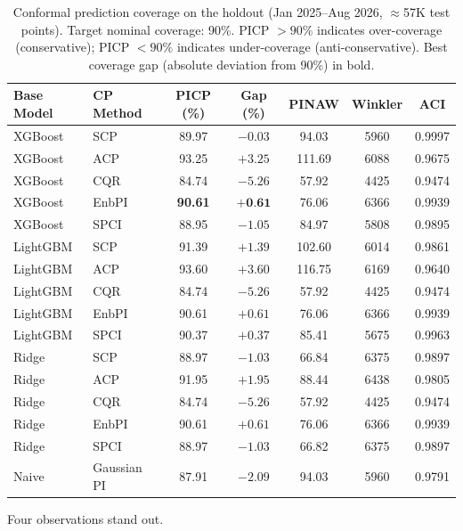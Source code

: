 \documentclass[preprint,12pt]{elsarticle}
\begin{document}
\begin{enumerate}
\begin{table}[t]
\centering
\caption{Conformal prediction coverage on the holdout (Jan 2025--Aug 2026, $\approx$57K test points). Target nominal coverage: 90\%. PICP $>90\%$ indicates over-coverage (conservative); PICP $<90\%$ indicates under-coverage (anti-conservative). Best coverage gap (absolute deviation from 90\%) in bold.}
\label{tab:main}
\begin{tabular}{llccccc}
\toprule
\textbf{Base Model} & \textbf{CP Method} & \textbf{PICP (\%)} & \textbf{Gap (\%)} & \textbf{PINAW} & \textbf{Winkler} & \textbf{ACI} \\
\midrule
XGBoost  & SCP           & 89.97 & $-0.03$ & 94.03 & 5960 & 0.9997 \\
XGBoost  & ACP           & 93.25 & $+3.25$ & 111.69 & 6088 & 0.9675 \\
XGBoost  & CQR           & 84.74 & $-5.26$ & 57.92 & 4425 & 0.9474 \\
XGBoost  & EnbPI         & \textbf{90.61} & $\textbf{+0.61}$ & 76.06 & 6366 & 0.9939 \\
XGBoost  & SPCI          & 88.95 & $-1.05$ & 84.97 & 5808 & 0.9895 \\
LightGBM & SCP           & 91.39 & $+1.39$ & 102.60 & 6014 & 0.9861 \\
LightGBM & ACP           & 93.60 & $+3.60$ & 116.75 & 6169 & 0.9640 \\
LightGBM & CQR           & 84.74 & $-5.26$ & 57.92 & 4425 & 0.9474 \\
LightGBM & EnbPI         & 90.61 & $+0.61$ & 76.06 & 6366 & 0.9939 \\
LightGBM & SPCI          & 90.37 & $+0.37$ & 85.41 & 5675 & 0.9963 \\
Ridge    & SCP           & 88.97 & $-1.03$ & 66.84 & 6375 & 0.9897 \\
Ridge    & ACP           & 91.95 & $+1.95$ & 88.44 & 6438 & 0.9805 \\
Ridge    & CQR           & 84.74 & $-5.26$ & 57.92 & 4425 & 0.9474 \\
Ridge    & EnbPI         & 90.61 & $+0.61$ & 76.06 & 6366 & 0.9939 \\
Ridge    & SPCI          & 88.97 & $-1.03$ & 66.82 & 6375 & 0.9897 \\
\midrule
Naive    & Gaussian PI   & 87.91 & $-2.09$ & 94.03 & 5960 & 0.9791 \\
\bottomrule
\end{tabular}
\end{table}

Four observations stand out.


\end{enumerate}
\end{document}
